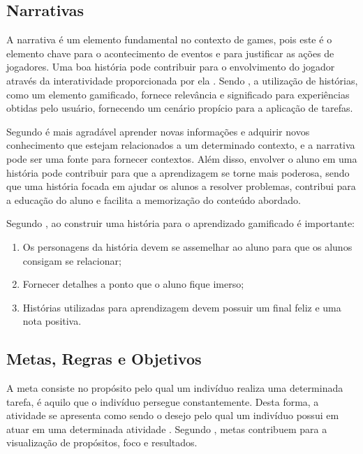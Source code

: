 \documentclass[
	12pt,				%
	oneside,			%
	a4paper,			%
	english,			%
	french,				%
	spanish,			%
	brazil,				%
	]{abntex2}
\begin{document}
\subsection{Narrativas}

A narrativa é um elemento fundamental no contexto de games, pois este é o elemento chave para o acontecimento de eventos e para justificar as ações de jogadores. Uma boa história pode contribuir para o envolvimento do jogador através da interatividade proporcionada por ela  \cite{fardo2013gamificaccao}. Sendo \citet{kaap:2014}, a utilização de histórias, como um elemento gamificado, fornece relevância e significado para experiências obtidas pelo usuário, fornecendo um cenário propício para a aplicação de tarefas.

Segundo \citet{fardo2013gamificaccao} é mais agradável aprender novas informações e adquirir novos conhecimento que estejam relacionados a um determinado contexto, e a narrativa pode ser uma fonte para fornecer contextos. Além disso, envolver o aluno em uma história pode contribuir para que a aprendizagem se torne mais poderosa, sendo que uma história focada em ajudar os alunos a resolver problemas, contribui para a educação do aluno e facilita a memorização do conteúdo abordado.

Segundo \citet{andre2018}, ao construir uma história para o aprendizado gamificado é importante:
\begin{enumerate}
\item Os personagens da história devem se assemelhar ao aluno para que os alunos consigam se relacionar;
\item Fornecer detalhes a ponto que o aluno fique imerso;
\item Histórias utilizadas para aprendizagem devem possuir um final feliz e uma nota positiva.
\end{enumerate}

\subsection{Metas, Regras e Objetivos}

A meta consiste no propósito pelo qual um indivíduo realiza uma determinada tarefa, é aquilo que o indivíduo persegue constantemente. Desta forma, a atividade se apresenta como sendo o desejo pelo qual um indivíduo possui em atuar em uma determinada atividade \cite{bunchball2016gamification}. Segundo \citet{kaap:2014}, metas contribuem para a visualização de propósitos, foco e resultados.
\end{document}
